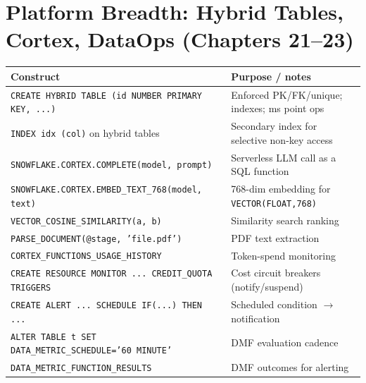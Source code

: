 \section{Platform Breadth: Hybrid Tables, Cortex, DataOps (Chapters 21--23)}
\begin{center}
\footnotesize
\begin{tabular}{@{}p{5.6cm}p{8.6cm}@{}}
\toprule
\textbf{Construct} & \textbf{Purpose / notes} \\
\midrule
\texttt{CREATE HYBRID TABLE (id NUMBER PRIMARY KEY, ...)} & Enforced PK/FK/unique; indexes; ms point ops \\
\texttt{INDEX idx (col)} on hybrid tables & Secondary index for selective non-key access \\
\texttt{SNOWFLAKE.CORTEX.COMPLETE(model, prompt)} & Serverless LLM call as a SQL function \\
\texttt{SNOWFLAKE.CORTEX.EMBED\_TEXT\_768(model, text)} & 768-dim embedding for \texttt{VECTOR(FLOAT,768)} \\
\texttt{VECTOR\_COSINE\_SIMILARITY(a, b)} & Similarity search ranking \\
\texttt{PARSE\_DOCUMENT(@stage, 'file.pdf')} & PDF text extraction \\
\texttt{CORTEX\_FUNCTIONS\_USAGE\_HISTORY} & Token-spend monitoring \\
\texttt{CREATE RESOURCE MONITOR ... CREDIT\_QUOTA TRIGGERS} & Cost circuit breakers (notify/suspend) \\
\texttt{CREATE ALERT ... SCHEDULE IF(...) THEN ...} & Scheduled condition $\rightarrow$ notification \\
\texttt{ALTER TABLE t SET DATA\_METRIC\_SCHEDULE='60 MINUTE'} & DMF evaluation cadence \\
\texttt{DATA\_METRIC\_FUNCTION\_RESULTS} & DMF outcomes for alerting \\
\bottomrule
\end{tabular}
\end{center}

